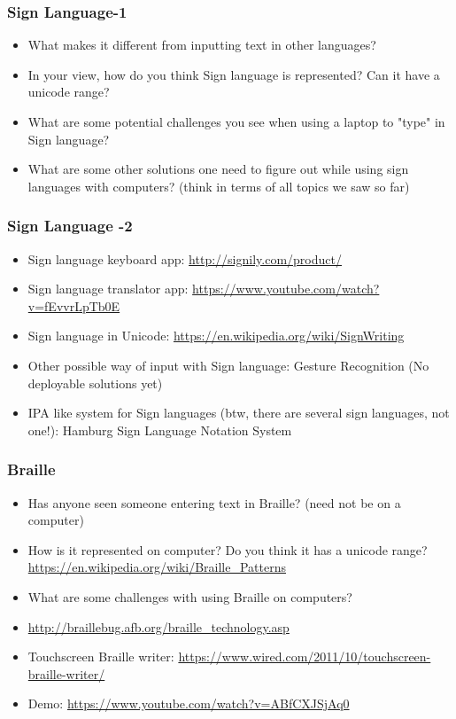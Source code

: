 \documentclass{beamer}
\begin{document}
\begin{frame}
\frametitle{Sign Language-1}
\begin{itemize}
\item What makes it different from inputting text in other languages? \pause
\item In your view, how do you think Sign language is represented? Can it have a unicode range? \pause
\item What are some potential challenges you see when using a laptop to "type" in Sign language? \pause
\item What are some other solutions one need to figure out while using sign languages with computers? (think in terms of all topics we saw so far)
\end{itemize}
\end{frame}


\begin{frame}
\frametitle{Sign Language -2}
\begin{itemize}
\item Sign language keyboard app: \url{http://signily.com/product/} \pause
\item Sign language translator app: \url{https://www.youtube.com/watch?v=fEvvrLpTb0E}
\item Sign language in Unicode: \url{https://en.wikipedia.org/wiki/SignWriting}
\item Other possible way of input with Sign language: Gesture Recognition (No deployable solutions yet)
\item IPA like system for Sign languages (btw, there are several sign languages, not one!): Hamburg Sign Language Notation System
\end{itemize}
\end{frame}

\begin{frame}
\frametitle{Braille}
\begin{itemize}
\item Has anyone seen someone entering text in Braille? (need not be on a computer) \pause
\item How is it represented on computer? Do you think it has a unicode range? \pause \\ \url{https://en.wikipedia.org/wiki/Braille_Patterns}
\item What are some challenges with using Braille on computers? \pause
\item \url{http://braillebug.afb.org/braille_technology.asp}
\item Touchscreen Braille writer: \url{https://www.wired.com/2011/10/touchscreen-braille-writer/}
\item Demo: \url{https://www.youtube.com/watch?v=ABfCXJSjAq0}
\end{itemize}
\end{frame}
\end{document}
